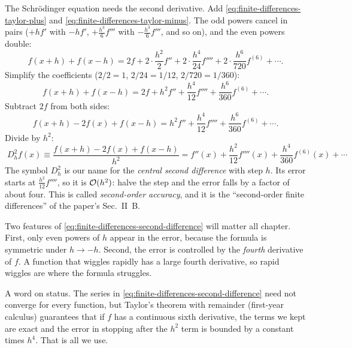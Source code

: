 The Schr\"odinger equation needs the second derivative. Add \eqref{eq:finite-differences-taylor-plus} and \eqref{eq:finite-differences-taylor-minus}. The odd powers cancel in pairs ($+hf'$ with $-hf'$, $+\tfrac{h^3}{6}f'''$ with $-\tfrac{h^3}{6}f'''$, and so on), and the even powers double:
\begin{equation*}
f(x+h)+f(x-h)=2f+2\cdot\frac{h^2}{2}f''+2\cdot\frac{h^4}{24}f''''+2\cdot\frac{h^6}{720}f^{(6)}+\cdots.
\end{equation*}
Simplify the coefficients ($2/2=1$, $2/24=1/12$, $2/720=1/360$):
\begin{equation*}
f(x+h)+f(x-h)=2f+h^2f''+\frac{h^4}{12}f''''+\frac{h^6}{360}f^{(6)}+\cdots.
\end{equation*}
Subtract $2f$ from both sides:
\begin{equation*}
f(x+h)-2f(x)+f(x-h)=h^2f''+\frac{h^4}{12}f''''+\frac{h^6}{360}f^{(6)}+\cdots.
\end{equation*}
Divide by $h^2$:
\begin{equation}
\boxed{\;D_h^2 f(x)\equiv\frac{f(x+h)-2f(x)+f(x-h)}{h^2}=f''(x)+\frac{h^2}{12}f''''(x)+\frac{h^4}{360}f^{(6)}(x)+\cdots\;}
\label{eq:finite-differences-second-difference}
\end{equation}
The symbol $D_h^2$ is our name for the \emph{central second difference} with step $h$. Its error starts at $\tfrac{h^2}{12}f''''$, so it is $\mathcal{O}(h^2)$: halve the step and the error falls by a factor of about four. This is called \emph{second-order accuracy}, and it is the ``second-order finite differences'' of the paper's Sec.~II~B.

Two features of \eqref{eq:finite-differences-second-difference} will matter all chapter. First, only even powers of $h$ appear in the error, because the formula is symmetric under $h\to-h$. Second, the error is controlled by the \emph{fourth} derivative of $f$. A function that wiggles rapidly has a large fourth derivative, so rapid wiggles are where the formula struggles.

A word on status. The series in \eqref{eq:finite-differences-second-difference} need not converge for every function, but Taylor's theorem with remainder (first-year calculus) guarantees that if $f$ has a continuous sixth derivative, the terms we kept are exact and the error in stopping after the $h^2$ term is bounded by a constant times $h^4$. That is all we use.

